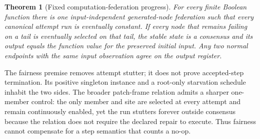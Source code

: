 \documentclass[11pt]{article}
\newtheorem{theorem}{Theorem}[section]
\theoremstyle{definition}
\theoremstyle{remark}
\numberwithin{equation}{section}
\begin{document}
\begin{theorem}[Fixed computation-federation progress]
\label{thm:fixed-computation-federation}
For every finite Boolean function there is one input-independent generated-node
federation such that every canonical attempt run is eventually constant.  If
every node that remains failing on a tail is eventually selected on that tail,
the stable state is a consensus and its output equals the function value for
the preserved initial input.  Any two normal endpoints with the same input
observation agree on the output register.
\end{theorem}

The fairness premise removes attempt stutter; it does not prove accepted-step
termination.  Its positive singleton instance and a root-only starvation
schedule inhabit the two sides.  The broader patch-frame relation admits a
sharper one-member control: the only member and site are selected at every
attempt and remain continuously enabled, yet the run stutters forever outside
consensus because the relation does not require the declared repair to execute.
Thus fairness cannot compensate for a step semantics that counts a no-op.
\end{document}
